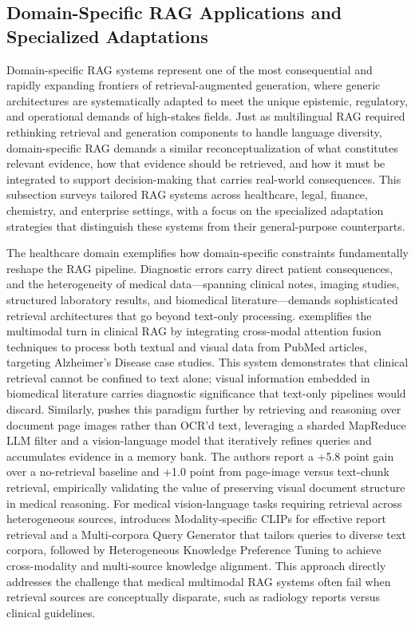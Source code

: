 \documentclass[11pt]{article}
\begin{document}
\subsection{Domain-Specific RAG Applications and Specialized Adaptations}

Domain-specific RAG systems represent one of the most consequential and rapidly expanding frontiers of retrieval-augmented generation, where generic architectures are systematically adapted to meet the unique epistemic, regulatory, and operational demands of high-stakes fields. Just as multilingual RAG required rethinking retrieval and generation components to handle language diversity, domain-specific RAG demands a similar reconceptualization of what constitutes relevant evidence, how that evidence should be retrieved, and how it must be integrated to support decision-making that carries real-world consequences. This subsection surveys tailored RAG systems across healthcare, legal, finance, chemistry, and enterprise settings, with a focus on the specialized adaptation strategies that distinguish these systems from their general-purpose counterparts.

The healthcare domain exemplifies how domain-specific constraints fundamentally reshape the RAG pipeline. Diagnostic errors carry direct patient consequences, and the heterogeneity of medical data---spanning clinical notes, imaging studies, structured laboratory results, and biomedical literature---demands sophisticated retrieval architectures that go beyond text-only processing. \cite{ref388} exemplifies the multimodal turn in clinical RAG by integrating cross-modal attention fusion techniques to process both textual and visual data from PubMed articles, targeting Alzheimer's Disease case studies. This system demonstrates that clinical retrieval cannot be confined to text alone; visual information embedded in biomedical literature carries diagnostic significance that text-only pipelines would discard. Similarly, \cite{ref389} pushes this paradigm further by retrieving and reasoning over document page images rather than OCR'd text, leveraging a sharded MapReduce LLM filter and a vision-language model that iteratively refines queries and accumulates evidence in a memory bank. The authors report a +5.8 point gain over a no-retrieval baseline and +1.0 point from page-image versus text-chunk retrieval, empirically validating the value of preserving visual document structure in medical reasoning. For medical vision-language tasks requiring retrieval across heterogeneous sources, \cite{ref390} introduces Modality-specific CLIPs for effective report retrieval and a Multi-corpora Query Generator that tailors queries to diverse text corpora, followed by Heterogeneous Knowledge Preference Tuning to achieve cross-modality and multi-source knowledge alignment. This approach directly addresses the challenge that medical multimodal RAG systems often fail when retrieval sources are conceptually disparate, such as radiology reports versus clinical guidelines.
\end{document}
